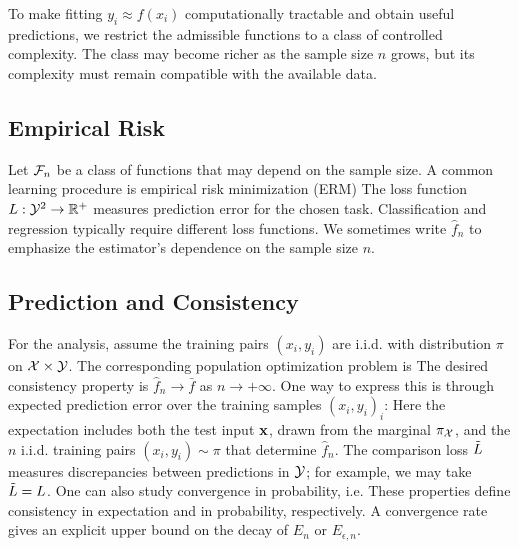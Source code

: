 To make fitting $y_i \approx f(x_i)$ computationally tractable and obtain useful predictions, we restrict the admissible functions to a class of controlled complexity. The class may become richer as the sample size $n$ grows, but its complexity must remain compatible with the available data.

\subsection{Empirical Risk}

Let $\mathcal{F}_n$ be a class of functions that may depend on the sample size. A common learning procedure is empirical risk minimization (ERM)
The loss function $L : \mathcal{Y}^2 \rightarrow \mathbb{R}^+$ measures prediction error for the chosen task. %
Classification and regression typically require different loss functions.
%
We sometimes write $\hat f_n$ to emphasize the estimator's dependence on the sample size $n$.


\subsection{Prediction and Consistency}

For the analysis, assume the training pairs $(x_i,y_i)$ are i.i.d. with distribution $\pi$ on $\mathcal{X} \times \mathcal{Y}$. The corresponding population optimization problem is
The desired consistency property is $\hat f_n \rightarrow \bar f$ as $n \rightarrow +\infty$. One way to express this is through expected prediction error over the training samples $(x_i,y_i)_i$:
Here the expectation includes both the test input $\mathbf{x}$, drawn from the marginal $\pi_{\mathcal{X}}$, and the $n$ i.i.d. training pairs $(x_i,y_i)\sim\pi$ that determine $\hat f_n$.
%
The comparison loss $\tilde{L}$ measures discrepancies between predictions in $\mathcal{Y}$; for example, we may take $\tilde{L}=L$.
One can also study convergence in probability, i.e. 
These properties define consistency in expectation and in probability, respectively.
%
A convergence rate gives an explicit upper bound on the decay of $E_n$ or $E_{\epsilon,n}$.

